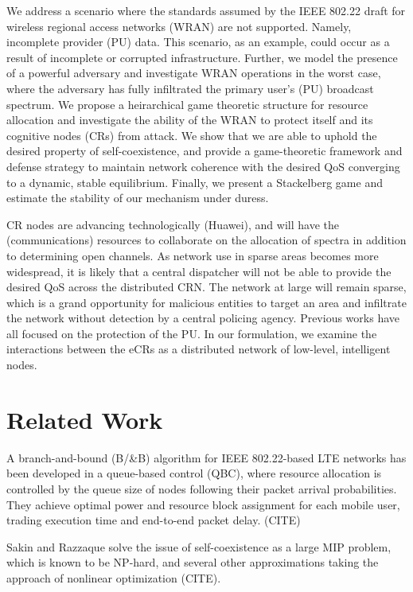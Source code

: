 \documentclass[10pt]{article}
\theoremstyle{definition}
\begin{document}
We address a scenario where the standards assumed by the IEEE 802.22 draft for
wireless regional access networks (WRAN) are not supported. Namely, incomplete
provider (PU) data. This
scenario, as an example, could occur as a result of incomplete or corrupted
infrastructure. Further, we model the presence of a
powerful adversary and investigate WRAN operations in the worst case, where the
adversary has fully infiltrated the primary user's (PU) broadcast
spectrum. We propose a heirarchical game theoretic structure for resource allocation 
and investigate the ability of the WRAN to protect itself
and its cognitive nodes (CRs) from attack. We show that we are able to uphold
the desired property of self-coexistence, and provide a game-theoretic framework
and defense strategy to maintain network coherence with the desired QoS
converging to a dynamic, stable equilibrium. Finally, we present a Stackelberg
game and estimate the stability of our mechanism under duress.

CR nodes are advancing technologically (Huawei), and will have the
(communications) resources to collaborate on the allocation of spectra in
addition to determining open channels. 
As network use in sparse areas becomes more widespread, it is likely that a central dispatcher will not be able
to provide the desired QoS across the distributed CRN. The network at large will
remain sparse, which is a grand opportunity for malicious entities to target an
area and infiltrate the network without detection by a central policing agency.
Previous works have all focused on the protection of the PU. In our formulation,
we examine the interactions between the eCRs as a distributed network of
low-level, intelligent nodes.

\section{Related Work}

A branch-and-bound (B/\&B) algorithm for IEEE 802.22-based LTE networks has been
developed in a queue-based control (QBC), where resource allocation is
controlled by the queue size of nodes following their packet arrival
probabilities. They achieve optimal power and resource block assignment for each
mobile user, trading execution time and end-to-end packet delay. (CITE) 

Sakin and Razzaque solve the issue of self-coexistence as a large MIP problem,
which is known to be NP-hard, and several other approximations taking the
approach of nonlinear optimization (CITE).
\end{document}

